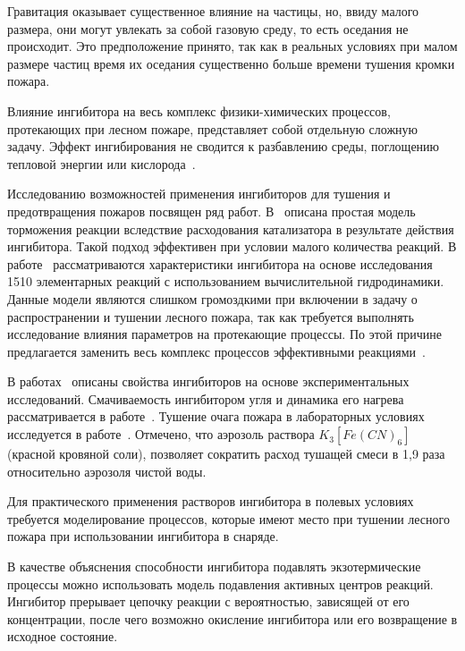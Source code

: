 Гравитация оказывает существенное влияние на частицы, но, ввиду малого размера, они могут увлекать за собой
газовую среду, то есть оседания не происходит.
Это предположение принято, так как в реальных условиях при малом размере частиц время их оседания существенно
больше времени тушения кромки пожара.

Влияние ингибитора на весь комплекс физики-химических процессов, протекающих при лесном пожаре, представляет собой
отдельную сложную задачу.
Эффект ингибирования не сводится к разбавлению среды, поглощению тепловой энергии или кислорода~\cite{sabinin_ingibitors_state_of_a_problem}.

Исследованию возможностей применения ингибиторов для тушения и предотвращения пожаров посвящен ряд работ.
В~\cite{study_shortstopping_runaway_reactions} описана простая модель торможения реакции вследствие расходования
катализатора в результате действия ингибитора.
Такой подход эффективен при условии малого количества реакций.
В работе~\cite{fire_suppression_characteristics_cf3h} рассматриваются характеристики ингибитора на основе исследования
1510 элементарных реакций с использованием вычислительной гидродинамики.
Данные модели являются слишком громоздкими при включении в задачу о распространении и тушении лесного пожара, так
как требуется выполнять исследование влияния параметров на протекающие процессы.
По этой причине предлагается заменить весь комплекс процессов
эффективными реакциями~\cite{fire_suppression_modeling_using_cfd, Korobeinichev2014}.

В работах~\cite{Experimental_study_on_optimizing_the_inhibition_effect, extinguishing_fires_with_aerosols} описаны
свойства ингибиторов на основе экспериментальных исследований.
Смачиваемость ингибитором угля и динамика его нагрева рассматривается в работе~\cite{Experimental_study_on_optimizing_the_inhibition_effect}.
Тушение очага пожара в лабораторных условиях исследуется в работе~\cite{extinguishing_fires_with_aerosols}.
Отмечено, что аэрозоль раствора $K_3[Fe(CN)_6]$ (красной кровяной соли), позволяет сократить расход тушащей смеси
в 1,9 раза относительно аэрозоля чистой воды.

Для практического применения растворов ингибитора в полевых условиях требуется моделирование процессов, которые
имеют место при тушении лесного пожара при использовании ингибитора в снаряде.

В качестве объяснения способности ингибитора подавлять экзотермические процессы можно использовать модель подавления
активных центров реакций.
Ингибитор прерывает цепочку реакции с вероятностью, зависящей от его концентрации, после чего возможно окисление
ингибитора или его возвращение в исходное состояние.

